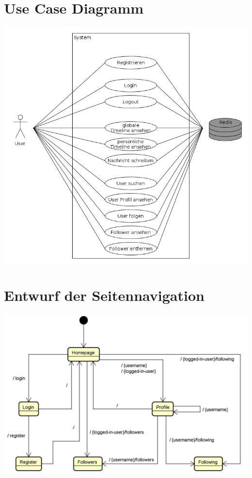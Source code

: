 \documentclass[
    a4paper
]{scrreprt}
\begin{document}
    \section{Use Case Diagramm}
    \includegraphics[width=\textwidth]{./images/useCaseDiagramm.png}

    \section{Entwurf der Seitennavigation}
	     \includegraphics[width=\textwidth]{./images/state-machine.png}
\end{document}
